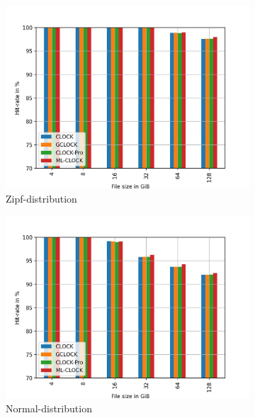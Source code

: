 \documentclass[
	12pt,
	a4paper,
	abstract,
	bibliography=totoc,
	chapterprefix,
	headings=openright,
	numbers=endperiod,
	parskip=half,
	twoside,
]{scrreprt}
\begin{document}
\begin{figure}[H]
	\centering
	\begin{subfigure}{0.4\textwidth}
		\includegraphics[width=\textwidth]{rw_90to10_zipf.jpg}		
		\caption{Zipf-distribution}
		\label{fig:rw_90to10  zipf}
	\end{subfigure}
	\hfill
	\begin{subfigure}{0.4\textwidth}
		\includegraphics[width=\textwidth]{rw_90to10_normal.jpg}		
		\caption{Normal-distribution}
		\label{fig:rw_90to10  normal}
	\end{subfigure}
	\hfill
	\begin{subfigure}{0.4\textwidth}

\end{subfigure}
\end{figure}
\end{document}
